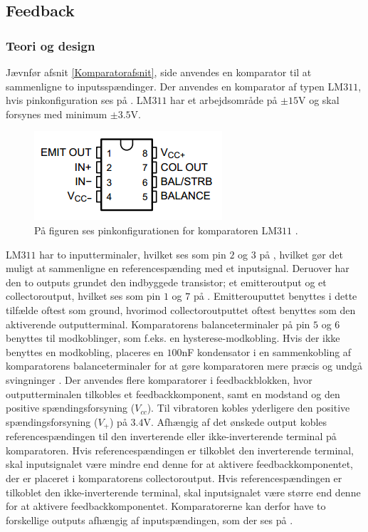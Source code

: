 \subsection{Feedback}
\subsubsection{Teori og design} \label{Afs_Komparator}
Jævnfør afsnit \ref{Komparatorafsnit}, side \pageref{Komparatorafsnit} anvendes en komparator til at sammenligne to inputsspændinger. Der anvendes en komparator af typen LM$311$, hvis pinkonfiguration ses på . LM$311$ har et arbejdsområde på $\pm15$V og skal forsynes med minimum $\pm3.5$V. 
\begin{figure}[H] 
	\centering
	\includegraphics[scale=0.9]{figures/cProblemloesning/LM311.PNG}
	\caption{På figuren ses pinkonfigurationen for komparatoren LM$311$ \cite{Instruments2015}.}
	\label{fig:LM311}
\end{figure}
\noindent LM$311$ har to inputterminaler, hvilket ses som pin $2$ og $3$ på , hvilket gør det muligt at sammenligne en referencespænding med et inputsignal. Deruover har den to outputs grundet den indbyggede transistor; et emitteroutput og et collectoroutput, hvilket ses som pin $1$ og $7$ på . Emitterouputtet benyttes i dette tilfælde oftest som ground, hvorimod collectoroutputtet oftest benyttes som den aktiverende outputterminal. Komparatorens balanceterminaler på pin $5$ og $6$ benyttes til modkoblinger, som f.eks. en hysterese-modkobling. Hvis der ikke benyttes en modkobling, placeres en $100$nF kondensator i en sammenkobling af komparatorens balanceterminaler for at gøre komparatoren mere præcis og undgå svingninger \cite{Instruments2015}. 
Der anvendes flere komparatorer i feedbackblokken, hvor outputterminalen tilkobles et feedbackkomponent, samt en modstand og den positive spændingsforsyning ($V_{cc}$). Til vibratoren kobles yderligere den positive spændingsforsyning ($V_+$) på $3.4$V. Afhængig af det ønskede output kobles referencespændingen til den inverterende eller ikke-inverterende terminal på komparatoren. Hvis referencespændingen er tilkoblet den inverterende terminal, skal inputsignalet være mindre end denne for at aktivere feedbackkomponentet, der er placeret i komparatorens collectoroutput. Hvis referencespændingen er tilkoblet den ikke-inverterende terminal, skal inputsignalet være større end denne for at aktivere feedbackkomponentet. Komparatorerne kan derfor have to forskellige outputs afhængig af inputspændingen, som der ses på . 

